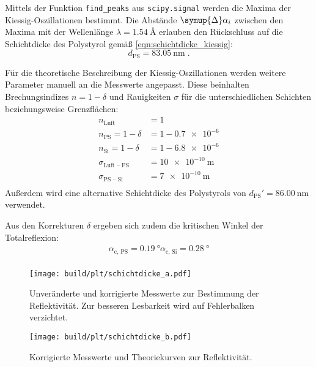 Mittels der Funktion \texttt{find\_peaks} aus \texttt{scipy.signal} werden die Maxima der Kiessig-Oszillationen bestimmt.
Die Abstände $\symup{\Delta} \alpha_i$ zwischen den Maxima
mit der Wellenlänge $\lambda = \SI{1.54}{\angstrom}$
erlauben den Rückschluss auf die Schichtdicke des Polystyrol gemäß \autoref{eqn:schichtdicke_kiessig}:
\[
    d_\text{PS} = \SI{83.05}{\nano\meter} \; .
\]

Für die theoretische Beschreibung der Kiessig-Oszillationen werden weitere Parameter manuell an die Messwerte angepasst.
Diese beinhalten Brechungsindizes $n = 1 - \delta$ und Rauigkeiten $\sigma$
für die unterschiedlichen Schichten beziehungsweise Grenzflächen:
\begin{align*}
    n_\text{Luft} &= 1 \\
    n_\text{PS} = 1 - \delta &= 1 - \num{0.7e-6} \\
    n_\text{Si} = 1 - \delta &= 1 - \num{6.8e-6} \\
    \sigma_\text{Luft – PS} &= \SI{10e-10}{\meter} \\
    \sigma_\text{PS – Si} &= \SI{7e-10}{\meter} \\
\end{align*}
Außerdem wird eine alternative Schichtdicke des Polystyrols von
$d_\text{PS}' = \SI{86.00}{\nano\meter}$ verwendet.

Aus den Korrekturen $\delta$ ergeben sich zudem die kritischen Winkel der Totalreflexion:
\begin{align*}
    \alpha_\text{c, PS} = \SI{0.19}{\degree}
    \alpha_\text{c, Si} = \SI{0.28}{\degree} \\
\end{align*}

\begin{figure}
    \centering
    \texttt{[image: build/plt/schichtdicke\_a.pdf]}
    \caption{
        Unveränderte und korrigierte Messwerte zur Bestimmung der Reflektivität.
        Zur besseren Lesbarkeit wird auf Fehlerbalken verzichtet.
    }
    \label{fig:plt:schichtdicke_a}
\end{figure}
\begin{figure}
    \centering
    \texttt{[image: build/plt/schichtdicke\_b.pdf]}
    \caption{Korrigierte Messwerte und Theoriekurven zur Reflektivität.}
    \label{fig:plt:schichtdicke_b}
\end{figure}
